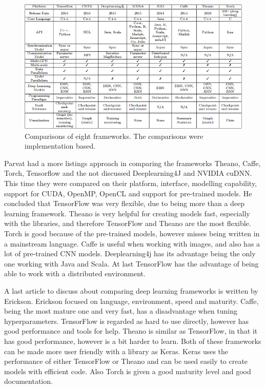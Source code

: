 \documentclass[10pt,a4paper]{report}
\begin{document}
	\begin{figure}[h!]
		\includegraphics[scale=0.8]{FrameworkComparisons.PNG}
		\caption{Comparisons of eight frameworks. The comparisons were 
			implementation based.}
		\label{fig:FramewComps}
	\end{figure}
	
	Parvat had a more listings approach in comparing the frameworks Theano, 
	Caffe, Torch, Tensorflow and the not discussed Deeplearning4J and NVIDIA 
	cuDNN. This time they were compared on their platform, interface, modelling 
	capability, support for CUDA, OpenMP, OpenCL and support for pre-trained 
	models. He concluded that TensorFlow was very flexible, due to being more 
	than a deep learning framework. Theano is very helpful for creating models 
	fast, especially with the libraries, and therefore TensorFlow and Theano 
	are the most flexible. Torch is good because of the pre-trained models, 
	however misses being written in a mainstream language. Caffe is useful when 
	working with images, and also has a lot of pre-trained CNN models. 
	Deeplearning4j has its advantage being the only one working with Java and 
	Scala. 
	At last TensorFlow has the advantage of being able to work with a 
	distributed environment. \cite{parvat2017survey}
	
	A last article to discuss about comparing deep learning frameworks is 
	written by Erickson. Erickson focused on language, environment, speed and 
	maturity. Caffe, being the most mature one and very fast, has a 
	disadvantage when tuning hyperparameters. TensorFlow is regarded as hard 
	to use directly, however has good performance and tools for help. Theano 
	is similar as TensorFlow, in that it has good performance, however is a 
	bit harder to learn. Both of these frameworks can be made more user 
	friendly with a library as Keras. Keras uses the performance of either 
	TensorFlow or Theano and can be used easily to create models with 
	efficient code. Also Torch is given a good maturity level and good 
	documentation. \cite{erickson2017toolkits}
	
\end{document}
